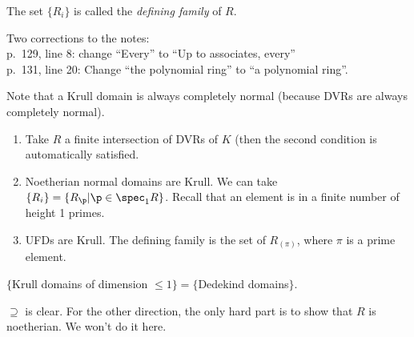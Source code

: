  The set $\{R_i\}$ is called the \emph{defining family} of $R$.
 \setcounter{lecture}{40}

 Two corrections to the notes:\\
 p.~129, line 8: change ``Every'' to ``Up to associates, every''\\
 p.~131, line 20: Change ``the polynomial ring'' to ``a polynomial ring''.

 Note that a Krull domain is always completely normal (because DVRs are always completely
 normal).

 \begin{example}
   \begin{enumerate}
     \item Take $R$ a finite intersection of DVRs of $K$ (then the second condition is
     automatically satisfied.
     \item Noetherian normal domains are Krull. We can take $\{R_i\}=\{R_\p|\p\in \spec_1
     R\}$. Recall that an element is in a finite number of height 1 primes.
     \item UFDs are Krull. The defining family is the set of $R_{(\pi)}$, where $\pi$ is
     a prime element.
   \end{enumerate}
   \vspace*{-1.7\baselineskip}
 \end{example}
 \begin{theorem}
   $\{$Krull domains of dimension $\le 1\} = \{$Dedekind domains$\}$.
 \end{theorem}
 $\supseteq$ is clear. For the other direction, the only hard part is to show that $R$
 is noetherian. We won't do it here.

